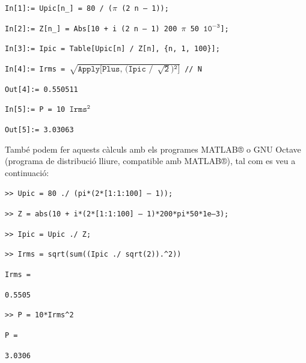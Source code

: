 \begin{exemple}
    \hspace{1cm}\texttt{In[1]:= Upic[n\_] = 80 / ($\mathtt{\pi}$ (2 n -- 1));}

    \hspace{1cm}\texttt{In[2]:= Z[n\_] = Abs[10 + i (2 n -- 1) 200 $\mathtt{\pi}$ 50 $\mathtt{10^{-3}}$];}

    \hspace{1cm}\texttt{In[3]:= Ipic = Table[Upic[n] / Z[n], \{n, 1, 100\}];}

    \hspace{1cm}\texttt{In[4]:= Irms = $\mathtt{\sqrt{\text{Apply[Plus, (Ipic /}\phantom{1} \sqrt{2}\text{)}{\phantom{}^2}\text{]}}}$ // N}

    \hspace{1cm}\texttt{Out[4]:= 0.550511}

    \hspace{1cm}\texttt{In[5]:= P = 10 $\mathtt{Irms^2}$}

    \hspace{1cm}\texttt{Out[5]:= 3.03063}\newline

    També podem fer aquests càlculs amb els programes
    MATLAB® o GNU Octave (programa de distribució lliure, compatible amb MATLAB®), tal com es veu a continuació:


    \hspace{1cm}\texttt{>{}> Upic = 80 ./ (pi*(2*[1:1:100] -- 1));}

    \hspace{1cm}\texttt{>{}> Z = abs(10 + i*(2*[1:1:100] -- 1)*200*pi*50*1e--3);}

    \hspace{1cm}\texttt{>{}> Ipic = Upic ./ Z;}

    \hspace{1cm}\texttt{>{}> Irms = sqrt(sum((Ipic ./ sqrt(2)).\^{}2))}

    \hspace{1cm}\texttt{Irms =}

    \hspace{1cm}\texttt{\phantom{Irms }0.5505}

    \hspace{1cm}\texttt{>{}> P = 10*Irms\^{}2}

    \hspace{1cm}\texttt{P =}

    \hspace{1cm}\texttt{\phantom{Irms }3.0306}\newline



\end{exemple}
